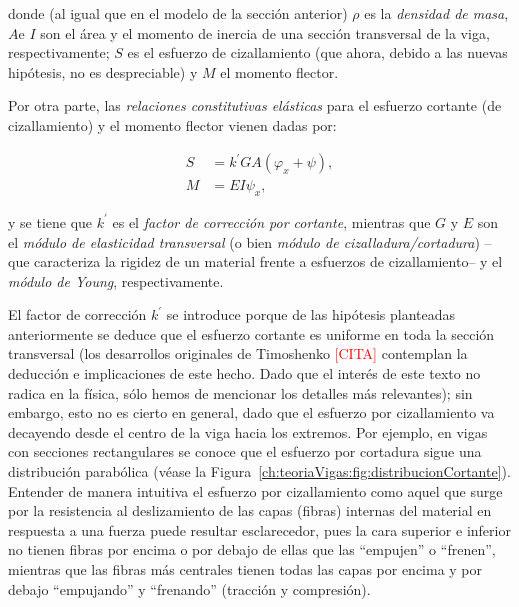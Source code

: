 donde (al igual que en el modelo de la sección anterior) $\rho$ es la \textit{densidad de masa}, $A$\footnotemark e $I$ son el área y el momento de inercia de una sección transversal de la viga, respectivamente; $S$ es el esfuerzo de cizallamiento (que ahora, debido a las nuevas hipótesis, no es despreciable) y $M$ el momento flector.  


Por otra parte, las \textit{relaciones constitutivas elásticas} para el esfuerzo cortante (de cizallamiento) y el momento flector vienen dadas por:

\begin{align}
    S &= k^{\prime}GA(\varphi_x + \psi), \label{timoshenkoBasico:relConstitutivasCortante}\\
    M &= EI \psi_x, \label{timoshenkoBasico:relConstitutivasFlector}
\end{align}

y se tiene que $k^{\prime}$ es el \textit{factor de corrección por cortante}, mientras que $G$ y $E$ son el \textit{módulo de elasticidad transversal} (o bien \textit{módulo de cizalladura/cortadura}) --que caracteriza la rigidez de un material frente a esfuerzos de cizallamiento-- y el \textit{módulo de Young}, respectivamente. 

El factor de corrección $k^{\prime}$ se introduce porque de las hipótesis planteadas anteriormente se deduce que el esfuerzo cortante es uniforme en toda la sección transversal (los desarrollos originales de Timoshenko \textcolor{red}{[CITA]} contemplan la deducción e implicaciones de este hecho. Dado que el interés de este texto no radica en la física, sólo hemos de mencionar los detalles más relevantes); sin embargo, esto no es cierto en general, dado que el esfuerzo por cizallamiento va decayendo desde el centro de la viga hacia los extremos. Por ejemplo, en vigas con secciones rectangulares se conoce que el esfuerzo por cortadura sigue una distribución parabólica (véase la Figura~\ref{ch:teoriaVigas:fig:distribucionCortante}). Entender de manera intuitiva el esfuerzo por cizallamiento como aquel que surge por la resistencia al deslizamiento de las capas (fibras) internas del material en respuesta a una fuerza puede resultar esclarecedor, pues la cara superior e inferior no tienen fibras por encima o por debajo de ellas que las ``empujen'' o ``frenen'', mientras que las fibras más centrales tienen todas las capas por encima y por debajo ``empujando'' y ``frenando'' (tracción y compresión).

